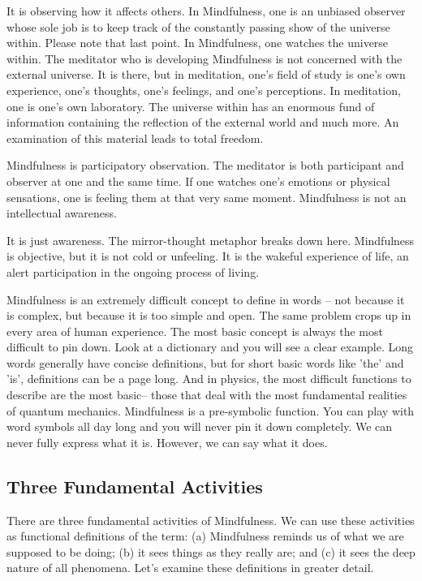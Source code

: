 It is observing how it affects others. In Mindfulness, one is an unbiased
observer whose sole job is to keep track of the constantly passing show of the
universe within. Please note that last point. In Mindfulness, one watches the
universe within. The meditator who is developing Mindfulness is not concerned
with the external universe. It is there, but in meditation, one's field of study
is one's own experience, one's thoughts, one's feelings, and one's perceptions.
In meditation, one is one's own laboratory. The universe within has an enormous
fund of information containing the reflection of the external world and much
more. An examination of this material leads to total freedom.

Mindfulness is participatory observation. The meditator is both participant and
observer at one and the same time. If one watches one's emotions or physical
sensations, one is feeling them at that very same moment. Mindfulness is not an
intellectual awareness.

It is just awareness. The mirror-thought metaphor breaks down here. Mindfulness
is objective, but it is not cold or unfeeling. It is the wakeful experience of
life, an alert participation in the ongoing process of living.

Mindfulness is an extremely difficult concept to define in words -- not because
it is complex, but because it is too simple and open. The same problem crops up
in every area of human experience. The most basic concept is always the most
difficult to pin down. Look at a dictionary and you will see a clear example.
Long words generally have concise definitions, but for short basic words like
'the' and 'is', definitions can be a page long. And in physics, the most
difficult functions to describe are the most basic-- those that deal with the
most fundamental realities of quantum mechanics. Mindfulness is a pre-symbolic
function. You can play with word symbols all day long and you will never pin it
down completely. We can never fully express what it is. However, we can say what
it does.

\subsection*{Three Fundamental Activities}
 There are three fundamental activities of
Mindfulness. We can use these activities as functional definitions of the term:
(a) Mindfulness reminds us of what we are supposed to be doing; (b) it sees
things as they really are; and (c) it sees the deep nature of all phenomena.
Let's examine these definitions in greater detail.

